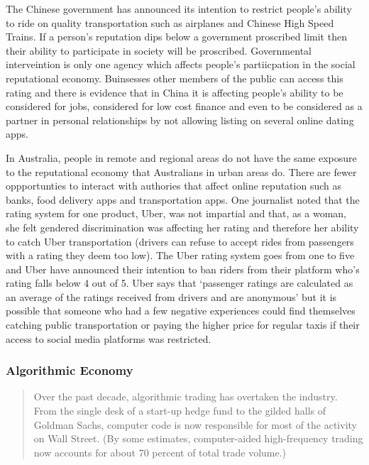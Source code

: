 The Chinese government has announced its intention to restrict people's ability to ride on quality transportation such as airplanes and Chinese High Speed Trains. If a person's reputation dips below a government proscribed limit then their ability to participate in society will be proscribed. Governmental interveintion is only one agency which affects people's partiicpation in the social reputational economy. Buinsesses other members of the public can access this rating and there is evidence that in China it is affecting people's ability to be considered for jobs, considered for low cost finance and even to be considered as a partner in personal relationships by not allowing listing on several online dating apps.\cite{Hvistendahl:2017}

In Australia, people in remote and regional areas do not have the same exposure to the reputational economy that Australians in urban areas do. There are fewer oppportunties to interact with authories that affect online reputation such as banks, food delivery apps and transportation apps. One journalist noted that the rating system for one product, Uber, was not impartial and that, as  a woman, she felt gendered discrimination was affecting her rating and therefore her ability to catch Uber transportation (drivers can refuse to accept rides from passengers with a rating they deem too low)\cite{Waters18}. The Uber rating system goes from one to five and Uber have announced their intention to ban riders from their platform who's rating falls below 4 out of 5\cite{Walsh18}. Uber says that `passenger ratings are calculated as an average of the ratings received from drivers and are anonymous'\cite{Waters18} but it is possible that someone who had a few negative experiences could find themselves catching public transportation or paying the higher price for regular taxis if their access to social media platforms was restricted.


\subsubsection{Algorithmic Economy}

\begin{quotation}
Over the past decade, algorithmic trading has overtaken the industry. From the single desk of a start-up hedge fund to the gilded halls of Goldman Sachs, computer code is now responsible for most of the activity on Wall Street. (By some estimates, computer-aided high-frequency trading now accounts for about 70 percent of total trade volume.)\cite{RefWorks:257}
\end{quotation}


